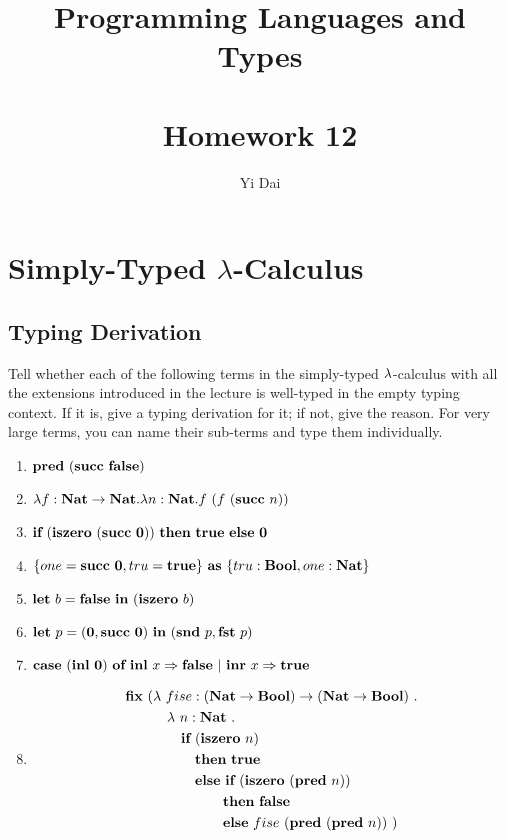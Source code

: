 \documentclass[a4paper,12pt]{article}
\title{
 Programming Languages and Types \\~\\
 \textbf{Homework 12}
}
\author{
 Yi Dai
}
\begin{document}
\maketitle

\section{Simply-Typed $\lambda$-Calculus}

\subsection{Typing Derivation}

Tell whether each of the following terms in the simply-typed $\lambda$-calculus with all the extensions 
introduced in the lecture is well-typed in the empty typing context.  If it is, give a typing derivation
for it; if not, give the reason.  For very large terms, you can name their sub-terms and type them
individually.

\begin{enumerate}
 \item $\textbf{pred}\ (\textbf{succ}\ \textbf{false})$
 \item $\lambda f : \textbf{Nat} \rightarrow \textbf{Nat} . \lambda n : \textbf{Nat} . f\ (f\ (\textbf{succ}\ n))$
 \item $\ifkw\ (\isze\ (\succ\ \zero))\ \thkw\ \true\ \elkw\ \zero$
 \item $\{one = \succ\ \zero, tru = \true\}\ \askw\ \{tru : \BlnT, one : \NatT\}$
 \item $\letk\ b = \fals\ \inkw\ (\isze\ b)$
 \item $\letk\ p = (\zero, \succ\ \zero)\ \inkw\ (\sndp\ p, \fstp\ p)$
 \item $\textbf{case}\ (\textbf{inl}\ \textbf{0})\ \textbf{of}\ \textbf{inl}\ x \Rightarrow \textbf{false}\ |\ \textbf{inr}\ x \Rightarrow \textbf{true}$
 \item
  \begin{align*}
   \fixp\ (& \lamb\ fise : (\NatT \rarr \BlnT) \rarr (\NatT \rarr \BlnT)\ . \\
           & \quad \lamb\ n : \NatT\ . \\
           & \quad \quad \ifkw\ (\isze\ n) \\
           & \quad \quad \quad \thkw\ \true \\
           & \quad \quad \quad \elkw\ \ifkw\ (\isze\ (\pred\ n)) \\
           & \quad \quad \quad \quad \quad \thkw\ \fals \\
           & \quad \quad \quad \quad \quad \elkw\ fise\ (\pred\ (\pred\ n))\ )
  \end{align*}
\end{enumerate}
\end{document}
